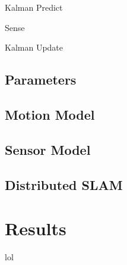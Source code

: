 \documentclass[prodmode,acmtecs]{acmsmall} %
\begin{document}
Kalman Predict

Sense

Kalman Update

\subsection{Parameters}

\subsection{Motion Model}

\subsection{Sensor Model}

\subsection{Distributed SLAM}

\section{Results}

lol
\end{document}
